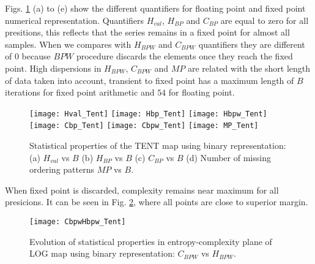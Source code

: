 Figs. \ref{fig:TENT_QuantiB} (a) to (e) show the different quantifiers for floating point and fixed point numerical representation.
Quantifiers $H_{val}$, $H_{BP}$ and $C_{BP}$ are equal to zero for all presitions, this reflects that the series remains in a fixed point for almost all samples. 
When we compares with $H_{BPW}$ and $C_{BPW}$ quantifiers they are different of $0$ because $BPW$ procedure discards the elements once they reach the fixed point.
High dispersions in $H_{BPW}$, $C_{BPW}$ and $MP$ are related with the short length of data taken into account, transient to fixed point has a maximum length of $B$ iterations for fixed point arithmetic and $54$ for floating point.

\begin{figure}
	\texttt{[image: Hval\_Tent]}
	\texttt{[image: Hbp\_Tent]}
	\texttt{[image: Hbpw\_Tent]}
	\texttt{[image: Cbp\_Tent]}
	\texttt{[image: Cbpw\_Tent]}
	\texttt{[image: MP\_Tent]}
	\caption{Statistical properties of the TENT map using binary representation: (a) $H_{val}$ vs $B$ (b) $H_{BP}$ vs $B$ (c) $C_{BP}$ vs $B$ (d) Number of missing ordering patterns $MP$ vs $B$.}
	\label{fig:TENT_QuantiB}
\end{figure}

When fixed point is discarded, complexity remains near maximum for all presicions.
It can be seen in Fig. \ref{fig:TENT_HC}, where all points are close to superior margin.

\begin{figure}
	\texttt{[image: CbpwHbpw\_Tent]}
	\caption{Evolution of statistical properties in entropy-complexity plane of LOG map using binary representation: $C_{BPW}$ vs $H_{BPW}$.}
	\label{fig:TENT_HC}
\end{figure}
